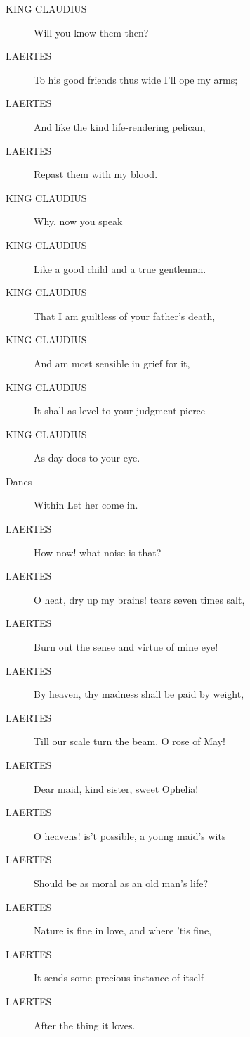\documentclass{article}
\begin{document}
\begin{description}
            
\item[KING CLAUDIUS] Will you know them then?
\end{description}
          
\begin{description}
            
\item[LAERTES] To his good friends thus wide I'll ope my arms;
\item[LAERTES] And like the kind life-rendering pelican,
\item[LAERTES] Repast them with my blood.
\end{description}
          
\begin{description}
            
\item[KING CLAUDIUS] Why, now you speak
\item[KING CLAUDIUS] Like a good child and a true gentleman.
\item[KING CLAUDIUS] That I am guiltless of your father's death,
\item[KING CLAUDIUS] And am most sensible in grief for it,
\item[KING CLAUDIUS] It shall as level to your judgment pierce
\item[KING CLAUDIUS] As day does to your eye.
\end{description}
          
\begin{description}
            
\item[Danes] 
               Within                Let her come in.
\end{description}
          
\begin{description}
            
\item[LAERTES] How now! what noise is that?
\item[LAERTES] O heat, dry up my brains! tears seven times salt,
\item[LAERTES] Burn out the sense and virtue of mine eye!
\item[LAERTES] By heaven, thy madness shall be paid by weight,
\item[LAERTES] Till our scale turn the beam. O rose of May!
\item[LAERTES] Dear maid, kind sister, sweet Ophelia!
\item[LAERTES] O heavens! is't possible, a young maid's wits
\item[LAERTES] Should be as moral as an old man's life?
\item[LAERTES] Nature is fine in love, and where 'tis fine,
\item[LAERTES] It sends some precious instance of itself
\item[LAERTES] After the thing it loves.
\end{description}
          
\end{document}
